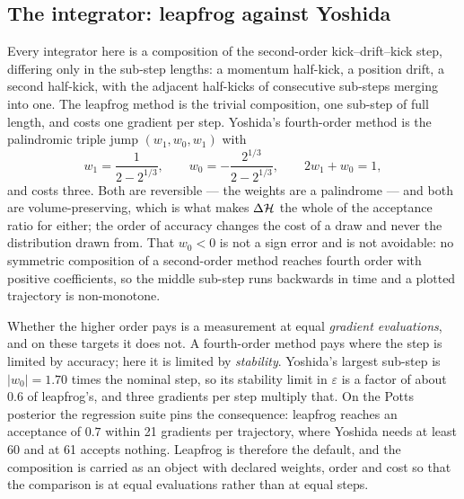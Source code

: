 \documentclass[11pt,a4paper]{article}
\begin{document}
\subsection{The integrator: leapfrog against Yoshida}
\label{app:hmc:integrator}
Every integrator here is a composition of the second-order kick--drift--kick
step, differing only in the sub-step lengths: a momentum half-kick, a position
drift, a second half-kick, with the adjacent half-kicks of consecutive
sub-steps merging into one. The leapfrog method is the trivial composition, one
sub-step of full length, and costs one gradient per step. Yoshida's fourth-order
method is the palindromic triple jump $(w_1, w_0, w_1)$ with
\begin{equation}
  w_1 = \frac{1}{2 - 2^{1/3}}, \qquad w_0 = -\frac{2^{1/3}}{2 - 2^{1/3}},
  \qquad 2 w_1 + w_0 = 1,
  \label{eq:yoshida}
\end{equation}
and costs three. Both are reversible --- the weights are a palindrome --- and
both are volume-preserving, which is what makes $\Delta \mathcal{H}$ the whole of
the acceptance ratio for either; the order of accuracy changes the cost of a
draw and never the distribution drawn from. That $w_0 < 0$ is not a sign error
and is not avoidable: no symmetric composition of a second-order method reaches
fourth order with positive coefficients, so the middle sub-step runs backwards
in time and a plotted trajectory is non-monotone.

Whether the higher order pays is a measurement at equal \emph{gradient
evaluations}, and on these targets it does not. A fourth-order method pays
where the step is limited by accuracy; here it is limited by \emph{stability}.
Yoshida's largest sub-step is $|w_0| = 1.70$ times the nominal step, so its
stability limit in $\varepsilon$ is a factor of about $0.6$ of leapfrog's,
and three gradients per step multiply that. On the Potts posterior the
regression suite pins the consequence: leapfrog reaches an acceptance of
$0.7$ within 21 gradients per trajectory, where Yoshida needs at least 60 and
at 61 accepts nothing. Leapfrog is therefore the default, and the composition
is carried as an object with declared weights, order and cost so that the
comparison is at equal evaluations rather than at equal steps.
\end{document}
